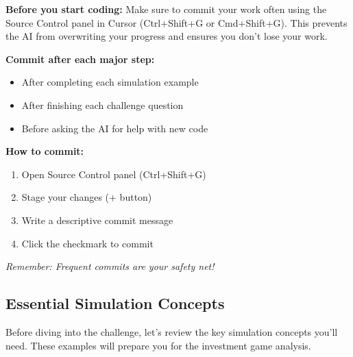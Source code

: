 \documentclass[
  letterpaper,
  DIV=11,
  numbers=noendperiod]{scrartcl}
\providecommand{\tightlist}{%
  \setlength{\itemsep}{0pt}\setlength{\parskip}{0pt}}
\theoremstyle{definition}
\theoremstyle{remark}
\begin{document}
\begin{tcolorbox}[enhanced jigsaw, titlerule=0mm, colbacktitle=quarto-callout-warning-color!10!white, coltitle=black, leftrule=.75mm, colback=white, colframe=quarto-callout-warning-color-frame, breakable, rightrule=.15mm, toprule=.15mm, title=\textcolor{quarto-callout-warning-color}{\faExclamationTriangle}\hspace{0.5em}{💾 Important: Save Your Work Frequently!}, bottomrule=.15mm, opacityback=0, bottomtitle=1mm, left=2mm, toptitle=1mm, arc=.35mm, opacitybacktitle=0.6]

\textbf{Before you start coding:} Make sure to commit your work often
using the Source Control panel in Cursor (Ctrl+Shift+G or Cmd+Shift+G).
This prevents the AI from overwriting your progress and ensures you
don't lose your work.

\textbf{Commit after each major step:}

\begin{itemize}
\tightlist
\item
  After completing each simulation example
\item
  After finishing each challenge question
\item
  Before asking the AI for help with new code
\end{itemize}

\textbf{How to commit:}

\begin{enumerate}
\def\labelenumi{\arabic{enumi}.}
\tightlist
\item
  Open Source Control panel (Ctrl+Shift+G)
\item
  Stage your changes (+ button)
\item
  Write a descriptive commit message
\item
  Click the checkmark to commit
\end{enumerate}

\emph{Remember: Frequent commits are your safety net!}

\end{tcolorbox}

\subsection{Essential Simulation Concepts
🎯}\label{sec-simulation-concepts}

Before diving into the challenge, let's review the key simulation
concepts you'll need. These examples will prepare you for the investment
game analysis.
\end{document}
